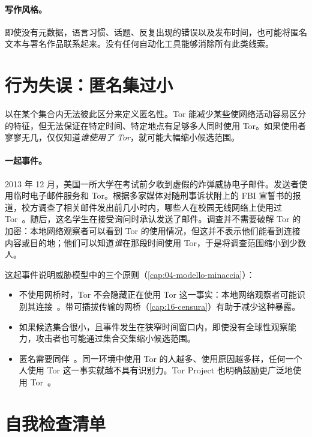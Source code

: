 \paragraph{写作风格。}即使没有元数据，语言习惯、话题、反复出现的错误以及发布时间，也可能将匿名文本与署名作品联系起来。没有任何自动化工具能够消除所有此类线索。

\section{行为失误：匿名集过小}\label{sec:opsec-insieme}

 以在某个集合内无法彼此区分来定义匿名性。Tor 能减少某些使网络活动容易区分的特征，但无法保证在特定时间、特定地点有足够多人同时使用 Tor。如果使用者寥寥无几，仅仅知道\emph{谁使用了 Tor}，就可能大幅缩小候选范围。

\paragraph{一起事件。}2013 年 12 月，美国一所大学在考试前夕收到虚假的炸弹威胁电子邮件。发送者使用临时电子邮件服务和 Tor。根据多家媒体对随刑事诉状附上的 FBI 宣誓书的报道，校方调查了相关邮件发出前几小时内，哪些人在校园无线网络上使用过 Tor~\cite{wbur2013harvard,sandvik2013harvard}。随后，这名学生在接受询问时承认发送了邮件。调查并不需要破解 Tor 的加密：本地网络观察者可以看到 Tor 的使用情况，但这并不表示他们能看到连接内容或目的地；他们可以知道\emph{谁}在那段时间使用 Tor，于是将调查范围缩小到少数人。

这起事件说明威胁模型中的三个原则（\cref{cap:04-modello-minaccia}）：
\begin{itemize}
  \item 不使用网桥时，Tor 不会隐藏正在使用 Tor 这一事实：本地网络观察者可能识别其连接~\cite{tailswarnings}。带可插拔传输的网桥（\cref{cap:16-censura}）有助于减少这种暴露。
  \item 如果候选集合很小，且事件发生在狭窄时间窗口内，即使没有全球性观察能力，攻击者也可能通过集合交集缩小候选范围。
  \item 匿名需要同伴~\cite{dingledine2006company}。同一环境中使用 Tor 的人越多、使用原因越多样，任何一个人使用 Tor 这一事实就越不具有识别力。Tor Project 也明确鼓励更广泛地使用 Tor~\cite{torsafety}。
\end{itemize}

\section{自我检查清单}\label{sec:opsec-lista}

